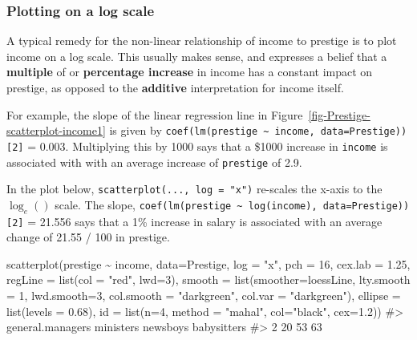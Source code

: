 \documentclass[
  letterpaper,
  10pt,
  krantz2]{krantz}
\makeatletter
\newenvironment{Shaded}{\begin{snugshade}}{\end{snugshade}}
\newcommand{\AttributeTok}[1]{\textcolor[rgb]{0.40,0.45,0.13}{#1}}
\newcommand{\CommentTok}[1]{\textcolor[rgb]{0.37,0.37,0.37}{#1}}
\newcommand{\DecValTok}[1]{\textcolor[rgb]{0.68,0.00,0.00}{#1}}
\newcommand{\FloatTok}[1]{\textcolor[rgb]{0.68,0.00,0.00}{#1}}
\newcommand{\FunctionTok}[1]{\textcolor[rgb]{0.28,0.35,0.67}{#1}}
\newcommand{\NormalTok}[1]{\textcolor[rgb]{0.00,0.23,0.31}{#1}}
\newcommand{\SpecialCharTok}[1]{\textcolor[rgb]{0.37,0.37,0.37}{#1}}
\newcommand{\StringTok}[1]{\textcolor[rgb]{0.13,0.47,0.30}{#1}}
\newenvironment{kframe}{%
  \medskip{}
  \setlength{\fboxsep}{.8em}
  \def\at@end@of@kframe{}%
  \ifinner\ifhmode%
  \def\at@end@of@kframe{\end{minipage}}%
  \begin{minipage}{\columnwidth}%
  \fi\fi%
  \def\FrameCommand##1{\hskip\@totalleftmargin \hskip-\fboxsep
  \colorbox{shadecolor}{##1}\hskip-\fboxsep
      \hskip-\linewidth \hskip-\@totalleftmargin \hskip\columnwidth}%
  \MakeFramed {\advance\hsize-\width
    \@totalleftmargin\z@ \linewidth\hsize
    \@setminipage}}%
{\par\unskip\endMakeFramed%
  \at@end@of@kframe}
\renewenvironment{Shaded}{\begin{kframe}}{\end{kframe}}
\makeatother
\begin{document}
\hypertarget{sec-log-scale}{%
\subsubsection{Plotting on a log scale}\label{sec-log-scale}}

A typical remedy for the non-linear relationship of income to prestige
is to plot income on a log scale. This usually makes sense, and
expresses a belief that a \textbf{multiple} of or \textbf{percentage
increase} in income has a constant impact on prestige, as opposed to the
\textbf{additive} interpretation for income itself.

For example, the slope of the linear regression line in
Figure~\ref{fig-Prestige-scatterplot-income1} is given by
\texttt{coef(lm(prestige\ \textasciitilde{}\ income,\ data=Prestige)){[}2{]}}
= 0.003. Multiplying this by 1000 says that a \$1000 increase in
\texttt{income} is associated with with an average increase of
\texttt{prestige} of 2.9.

In the plot below, \texttt{scatterplot(...,\ log\ =\ "x")} re-scales the
x-axis to the \(\log_e()\) scale. The slope,
\texttt{coef(lm(prestige\ \textasciitilde{}\ log(income),\ data=Prestige)){[}2{]}}
= 21.556 says that a 1\% increase in salary is associated with an
average change of 21.55 / 100 in prestige.

\begin{Shaded}
\begin{Highlighting}[]
\FunctionTok{scatterplot}\NormalTok{(prestige }\SpecialCharTok{\textasciitilde{}}\NormalTok{ income, }\AttributeTok{data=}\NormalTok{Prestige,}
  \AttributeTok{log =} \StringTok{"x"}\NormalTok{,}
  \AttributeTok{pch =} \DecValTok{16}\NormalTok{, }\AttributeTok{cex.lab =} \FloatTok{1.25}\NormalTok{,}
  \AttributeTok{regLine =} \FunctionTok{list}\NormalTok{(}\AttributeTok{col =} \StringTok{"red"}\NormalTok{, }\AttributeTok{lwd=}\DecValTok{3}\NormalTok{),}
  \AttributeTok{smooth =} \FunctionTok{list}\NormalTok{(}\AttributeTok{smoother=}\NormalTok{loessLine,}
                \AttributeTok{lty.smooth =} \DecValTok{1}\NormalTok{, }\AttributeTok{lwd.smooth=}\DecValTok{3}\NormalTok{,}
                \AttributeTok{col.smooth =} \StringTok{"darkgreen"}\NormalTok{, }\AttributeTok{col.var =} \StringTok{"darkgreen"}\NormalTok{),}
  \AttributeTok{ellipse =} \FunctionTok{list}\NormalTok{(}\AttributeTok{levels =} \FloatTok{0.68}\NormalTok{),}
  \AttributeTok{id =} \FunctionTok{list}\NormalTok{(}\AttributeTok{n=}\DecValTok{4}\NormalTok{, }\AttributeTok{method =} \StringTok{"mahal"}\NormalTok{, }\AttributeTok{col=}\StringTok{"black"}\NormalTok{, }\AttributeTok{cex=}\FloatTok{1.2}\NormalTok{))}
\CommentTok{\#\textgreater{} general.managers        ministers         newsboys      babysitters }
\CommentTok{\#\textgreater{}                2               20               53               63}
\end{Highlighting}
\end{Shaded}
\end{document}
